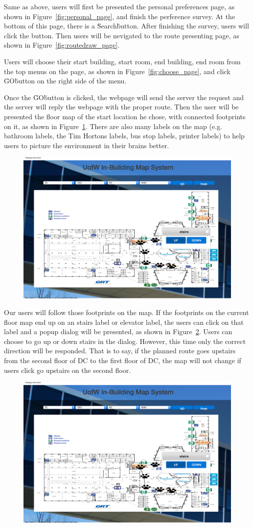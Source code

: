 \documentclass{sigchi}
\begin{document}
Same as above, users will first be presented the personal preferences page, as shown in Figure~\ref{fig:personal_page}, and finish the perference survey. At the bottom of this page, there is a \"Search\" button. After finishing the survey, users will click the button. Then users will be nevigated to the route presenting page, as shown in Figure~\ref{fig:routedraw_page}.



Users will choose their start building, start room, end building, end room from the top menus on the page, as shown in Figure~\ref{fig:choose_page}, and click \"GO\" button on the right side of the menu.


Once the \"GO\" button is clicked, the webpage will send the server the request and the server will reply the webpage with the proper route. Then the user will be presented the floor map of the start location he chose, with connected footprints on it, as shown in Figure~\ref{fig:map7}. There are also many labels on the map (e.g. bathroom labels, the Tim Hortons labels, bus stop labels, printer labels) to help users to picture the environment in their brains better. 

\begin{figure}[!h]
\centering
\includegraphics[width=0.6\columnwidth]{pics/map7.png}
\label{fig:map7}
\end{figure}

Our users will follow those footprints on the map. If the footprints on the current floor map end up on an stairs label or elevator label, the users can click on that label and a popup dialog will be presented, as shown in Figure~\ref{fig:map8}. Users can choose to go up or down stairs in the dialog. However, this time only the correct direction will be responded. That is to say, if the planned route goes upstairs from the second floor of DC to the first floor of DC, the map will not change if users click go upstairs on the second floor.

\begin{figure}[!h]
\centering
\includegraphics[width=0.6\columnwidth]{pics/map8.png}
\label{fig:map8}
\end{figure}
\end{document}
